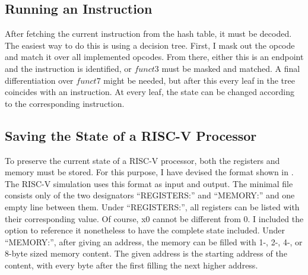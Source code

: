 

\subsection{Running an Instruction}
After fetching the current instruction from the hash table, it must
be decoded. The easiest way to do this is using a decision tree.
First, I mask out the opcode and match it over all implemented
opcodes. From there, either this is an endpoint and the instruction
is identified, or $funct3$ must be masked and matched. A final
differentiation over $funct7$ might be needed, but after this every
leaf in the tree coincides with an instruction. At every leaf, the
state can be changed according to the corresponding instruction.

\subsection{Saving the State of a RISC-V
      Processor}\label{sub:statefile}

To preserve the current state of a RISC-V processor, both the
registers and memory must be stored. For this purpose, I have devised
the format shown in . The RISC-V simulation
uses this format as input and output. The minimal file consists only
of the two designators \enquote{REGISTERS:} and \enquote{MEMORY:} and
one empty line between them. Under \enquote{REGISTERS:}, all
registers can be listed with their corresponding value. Of course, x0
cannot be different from 0. I included the option to reference it
nonetheless to have the complete state included. Under
\enquote{MEMORY:}, after giving an address, the memory can be filled
with 1-, 2-, 4-, or 8-byte sized memory content. The given address is
the starting address of the content, with every byte after the first
filling the next higher address.


